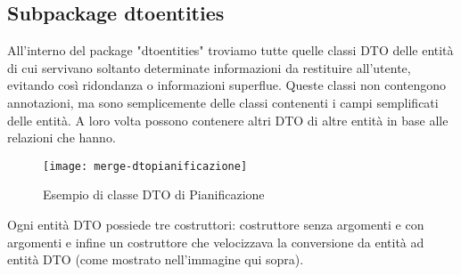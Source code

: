 \subsection{Subpackage dtoentities}
All'interno del package "dtoentities" troviamo tutte quelle classi DTO delle entità di cui servivano soltanto determinate informazioni da restituire all'utente, evitando così ridondanza o informazioni superflue. Queste classi non contengono annotazioni, ma sono semplicemente delle classi contenenti i campi semplificati delle entità. A loro volta possono contenere altri DTO di altre entità in base alle relazioni che hanno.
\begin{figure}[H] 
    \centering 
    \texttt{[image: merge-dtopianificazione]} 
    \caption{Esempio di classe DTO di Pianificazione}
\end{figure}
\noindent Ogni entità DTO possiede tre costruttori: costruttore senza argomenti e con argomenti e infine un costruttore che velocizzava la conversione da entità ad entità DTO (come mostrato nell'immagine qui sopra).